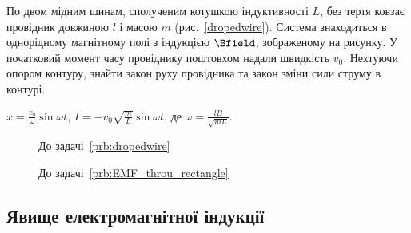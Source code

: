 \begin{problem}\label{prb:dropedwire}
По двом мідним шинам, сполученим котушкою індуктивності $L$, без тертя ковзає провідник довжиною $l$ і масою $m$ (рис.~\ref{dropedwire}). Система знаходиться в однорідному магнітному полі з індукцією $\Bfield$, зображеному на рисунку. У початковий момент часу провіднику поштовхом надали швидкість $v_0$. Нехтуючи опором контуру, знайти закон руху провідника та закон зміни сили струму в контурі.
\begin{solution}
	$x = \frac{v_0}{\omega}\sin\omega t$,
	$I = -v_0\sqrt{\frac{m}{L}}\sin\omega t$,
	де $\omega = \frac{lB}{\sqrt{mL}}$.
\end{solution}
\end{problem}

\begin{figure}[h!]\centering
\begin{minipage}[t]{0.45\linewidth}\centering
	\caption{До задачі~\ref{prb:dropedwire}}
	\label{dropedwire}
\end{minipage}
	\begin{minipage}[t]{0.45\linewidth}\centering
		\caption{До задачі~\ref{prb:EMF_throu_rectangle}}
		\label{EMF_throu_rectangle}
	\end{minipage}
\end{figure}
\subsection*{Явище електромагнітної індукції}

